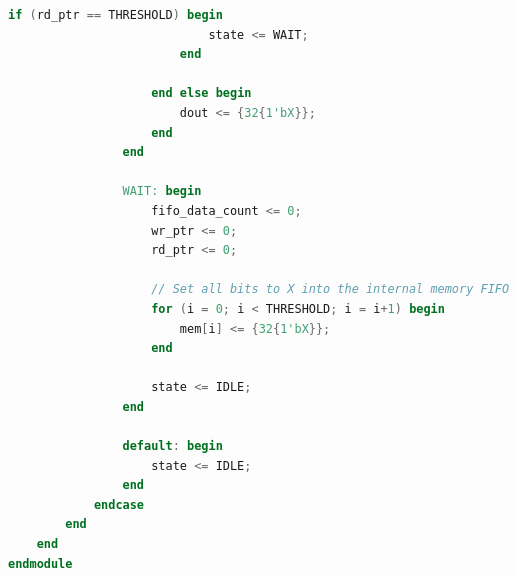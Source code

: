 \begin{lstlisting}[language=verilog,frame=single,caption={Código fuente de la cola FIFO de salida de datos},showstringspaces=false,label=lst:legacyFifoOut]
                        if (rd_ptr == THRESHOLD) begin
                            state <= WAIT;
                        end

                    end else begin
                        dout <= {32{1'bX}};
                    end
                end

                WAIT: begin
                    fifo_data_count <= 0;
                    wr_ptr <= 0;
                    rd_ptr <= 0;
                            
                    // Set all bits to X into the internal memory FIFO
                    for (i = 0; i < THRESHOLD; i = i+1) begin
                        mem[i] <= {32{1'bX}}; 
                    end
                    
                    state <= IDLE;
                end

                default: begin
                    state <= IDLE;
                end
            endcase
        end
    end
endmodule
\end{lstlisting}
